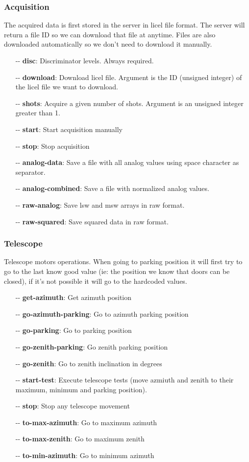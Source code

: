 \documentclass[letterpaper, 10 pt]{article}
\begin{document}
\subsubsection{Acquisition}
The acquired data is first stored in the server in licel file format. The server will return a file ID so we can download that file at anytime. Files are also downloaded automatically so we don't need to download it manually.
\begin{itemize}
	\item[-{}-] \textbf{disc}: Discriminator levels. Always required.
	\item[-{}-] \textbf{download}: Download licel file. Argument is the ID (unsigned integer) of the licel file we want to download.
	\item[-{}-] \textbf{shots}: Acquire a given number of shots. Argument is an unsigned integer greater than 1. 
	\item[-{}-] \textbf{start}: Start acquisition manually
	\item[-{}-] \textbf{stop}: Stop acquisition
	\item[-{}-] \textbf{analog-data}: Save a file with all analog values using space character as separator.
	\item[-{}-] \textbf{analog-combined}: Save a file with normalized analog values.
	\item[-{}-] \textbf{raw-analog}: Save lsw and msw arrays in raw format.
	\item[-{}-] \textbf{raw-squared}: Save squared data in raw format.
\end{itemize}
\subsubsection{Telescope}
Telescope motors operations. When going to parking position it will first try to go to the last know good value (ie: the position we know that doors can be closed), if it's not possible it will go to the hardcoded values.
\begin{itemize}
	\item[-{}-] \textbf{get-azimuth}: Get azimuth position
	\item[-{}-] \textbf{go-azimuth-parking}: Go to azimuth parking position
	\item[-{}-] \textbf{go-parking}: Go to parking position
	\item[-{}-] \textbf{go-zenith-parking}: Go zenith parking position
	\item[-{}-] \textbf{go-zenith}: Go to zenith inclination in degrees
	\item[-{}-] \textbf{start-test}: Execute telescope tests (move azmiuth and zenith to their maximum, minimum and parking position).
	\item[-{}-] \textbf{stop}: Stop any telescope movement
	\item[-{}-] \textbf{to-max-azimuth}: Go to maximum azimuth
	\item[-{}-] \textbf{to-max-zenith}: Go to maximum zenith
	\item[-{}-] \textbf{to-min-azimuth}: Go to minimum azimuth		
\end{itemize}
\end{document}

